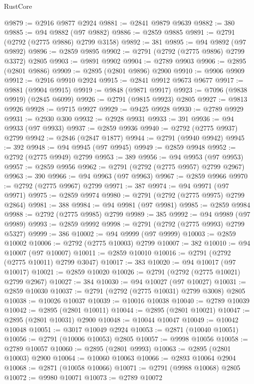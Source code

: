 \begin{lexlean}{RustCore}
\begin{coremodule}
@9879 := @2916 @9877 @2924
@9881 := @2841 @9879 @9639
@9882 := 380
@9885 := @94 @9882 (@97 @9882)
@9886 := @2859 @9885
@9891 := @2791 (@2792 (@2775 @9886) @2799 @3158)
@9892 := 381
@9895 := @94 @9892 (@97 @9892)
@9896 := @2859 @9895
@9902 := @2791 (@2792 (@2775 @9896) @2799 @3372) @2805
@9903 := @9891 @9902
@9904 := @2789 @9903
@9906 := @2895 (@2801 @9886)
@9909 := @2895 (@2801 @9896) @2900
@9910 := @9906 @9909
@9912 := @2916 @9910 @2924
@9915 := @2841 @9912 @9673 @9677
@9917 := @9881 (@9904 @9915)
@9919 := @9848 (@9871 @9917)
@9923 := @7096 (@9838 @9919) (@2845 @6099)
@9926 := @2791 (@9815 @9923) @2805
@9927 := @9813 @9926
@9928 := @9715 @9927
@9929 := @9425 @9928
@9930 := @2789 @9929
@9931 := @2930 @300
@9932 := @2928 @9931
@9933 := 391
@9936 := @94 @9933 (@97 @9933)
@9937 := @2859 @9936
@9940 := @2792 (@2775 @9937) @2799
@9942 := @2846 (@2847 @1877)
@9944 := @2791 (@9940 @9942)
@9945 := 392
@9948 := @94 @9945 (@97 @9945)
@9949 := @2859 @9948
@9952 := @2792 (@2775 @9949) @2799
@9953 := 389
@9956 := @94 @9953 (@97 @9953)
@9957 := @2859 @9956
@9962 := @2791 (@2792 (@2775 @9957) @2799 @2967)
@9963 := 390
@9966 := @94 @9963 (@97 @9963)
@9967 := @2859 @9966
@9970 := @2792 (@2775 @9967) @2799
@9971 := 387
@9974 := @94 @9971 (@97 @9971)
@9975 := @2859 @9974
@9980 := @2791 (@2792 (@2775 @9975) @2799 @2864)
@9981 := 388
@9984 := @94 @9981 (@97 @9981)
@9985 := @2859 @9984
@9988 := @2792 (@2775 @9985) @2799
@9989 := 385
@9992 := @94 @9989 (@97 @9989)
@9993 := @2859 @9992
@9998 := @2791 (@2792 (@2775 @9993) @2799 @5327)
@9999 := 386
@10002 := @94 @9999 (@97 @9999)
@10003 := @2859 @10002
@10006 := @2792 (@2775 @10003) @2799
@10007 := 382
@10010 := @94 @10007 (@97 @10007)
@10011 := @2859 @10010
@10016 := @2791 (@2792 (@2775 @10011) @2799 @3047)
@10017 := 383
@10020 := @94 @10017 (@97 @10017)
@10021 := @2859 @10020
@10026 := @2791 (@2792 (@2775 @10021) @2799 @2967)
@10027 := 384
@10030 := @94 @10027 (@97 @10027)
@10031 := @2859 @10030
@10037 := @2791 (@2792 (@2775 @10031) @2799 @3008) @2805
@10038 := @10026 @10037
@10039 := @10016 @10038
@10040 := @2789 @10039
@10042 := @2895 (@2801 @10011)
@10044 := @2895 (@2801 @10021)
@10047 := @2895 (@2801 @10031) @2900
@10048 := @10044 @10047
@10049 := @10042 @10048
@10051 := @3017 @10049 @2924
@10053 := @2871 (@10040 @10051)
@10056 := @2791 (@10006 @10053) @2805
@10057 := @9998 @10056
@10058 := @2789 @10057
@10060 := @2895 (@2801 @9993)
@10063 := @2895 (@2801 @10003) @2900
@10064 := @10060 @10063
@10066 := @2893 @10064 @2904
@10068 := @2871 (@10058 @10066)
@10071 := @2791 (@9988 @10068) @2805
@10072 := @9980 @10071
@10073 := @2789 @10072

\end{coremodule}
\end{lexlean}
